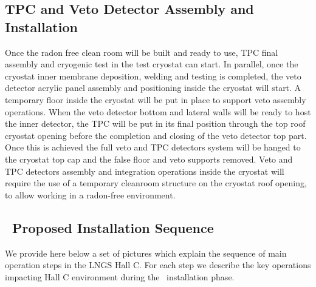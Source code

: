 \subsection{TPC and Veto Detector Assembly and Installation}
\label{sec:TPCAndVetoAssembly}

Once the radon free clean room will be built and ready to use, TPC final assembly and
cryogenic test in the test cryostat can start. In parallel, once the cryostat inner membrane
deposition, welding and testing is completed, the veto detector acrylic panel assembly and
positioning inside the cryostat will start. A temporary floor inside the cryostat will be put in
place to support veto assembly operations. When the veto detector bottom and lateral walls
will be ready to host the inner detector, the TPC will be put in its final position through the
top roof cryostat opening before the completion and closing of the veto detector top part.
Once this is achieved the full veto and TPC detectors system will be hanged to the cryostat
top cap and the false floor and veto supports removed. Veto and TPC detectors assembly and
integration operations inside the cryostat will require the use of a temporary cleanroom
structure on the cryostat roof opening, to allow working in a radon-free environment.

\subsection{\DSks\ Proposed Installation Sequence}
\label{sec:InstallationSequence}

We provide here below a set of pictures which explain the sequence of main operation steps in
the LNGS Hall C. For each step we describe the key operations impacting Hall C
environment during the \DSks\ installation phase.

